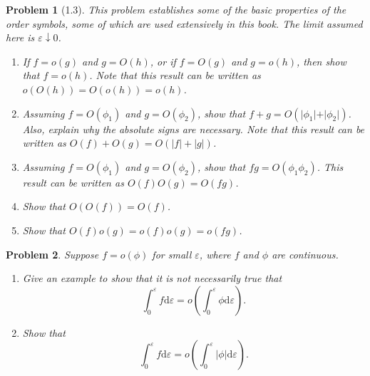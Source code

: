\documentclass[11pt]{article}
\theoremstyle{problemstyle}
\newtheorem{problem}{Problem}
\begin{document}
\begin{problem}[1.3]
This problem establishes some of the basic properties of the order symbols, some of which are used
extensively in this book. The limit assumed here is $\varepsilon \downarrow 0$.
\begin{enumerate}
\item If $f = o(g)$ and $g = O(h)$, or if $f = O(g)$ and $g = o(h)$, then show that $f = o(h)$. Note
  that this result can be written as $o(O(h)) = O(o(h)) = o(h)$.
\item Assuming $f = O(\phi_1)$ and $g = O(\phi_2)$, show that $f + g = O(\vert \phi_1 \vert  + \vert
  \phi_2 \vert)$. Also, explain why the absolute signs are necessary. Note that this result can be
  written as $O(f) + O(g) = O(|f| + |g|)$.
\item Assuming $f = O(\phi_1)$ and $g = O(\phi_2)$, show that $fg = O(\phi_1 \phi_2)$. This result
  can be written as $O(f) O(g) = O(fg)$.
\item Show that $O(O(f)) = O(f)$.
\item Show that $O(f)o(g) = o(f)o(g) = o(fg)$.
\end{enumerate}
\end{problem}

\begin{problem}{1.5}
Suppose $f=o(\phi)$ for small $\varepsilon$, where $f$ and $\phi$ are continuous.
\begin{enumerate}
  \item Give an example to show that it is not necessarily true that
    \[ \int_0^\varepsilon f \mathrm{d} \varepsilon = o\left(\int_0^\varepsilon \phi \mathrm{d}
    \varepsilon \right).\]
  \item Show that 
    \[ \int_0^\varepsilon f \mathrm{d} \varepsilon = o\left(\int_0^\varepsilon \vert \phi \vert
    \mathrm{d} \varepsilon \right).\]
\end{enumerate}
\end{problem}
\end{document}
